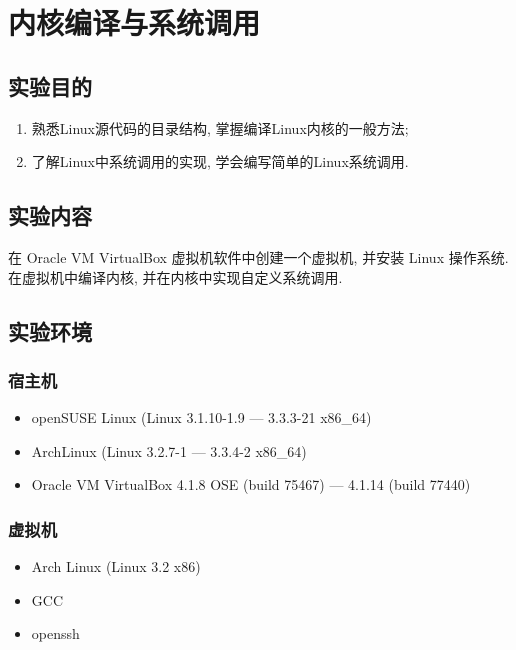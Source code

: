 \documentclass[11pt]{report}
\begin{document}
\frontpage

\chapter{内核编译与系统调用}

    \section{实验目的}

        \begin{enumerate}
            \item 熟悉Linux源代码的目录结构, 掌握编译Linux内核的一般方法;
            \item 了解Linux中系统调用的实现, 学会编写简单的Linux系统调用.
        \end{enumerate}

    \section{实验内容}

        在 Oracle VM VirtualBox 虚拟机软件中创建一个虚拟机, 并安装 Linux 操作系统. 在虚拟机中编译内核, 并在内核中实现自定义系统调用.

    \section{实验环境}

        \subsection{宿主机}

            \begin{itemize}
                \item openSUSE Linux (Linux 3.1.10-1.9 --- 3.3.3-21 x86\_64)
                \item ArchLinux (Linux 3.2.7-1 --- 3.3.4-2 x86\_64)
                \item Oracle VM VirtualBox 4.1.8 OSE (build 75467) --- 4.1.14 (build 77440)
            \end{itemize}

        \subsection{虚拟机}

            \begin{itemize}
                \item Arch Linux (Linux 3.2 x86)
                \item GCC
                \item openssh
            \end{itemize}
\end{document}

